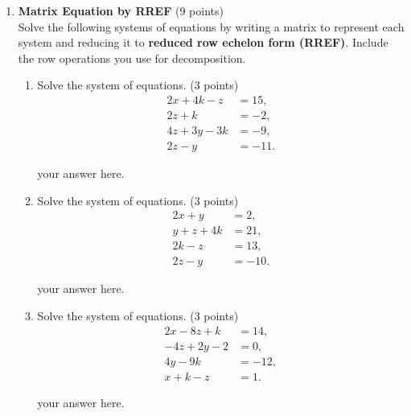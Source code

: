 \begin{enumerate}
  \newpage

  \item \textbf{Matrix Equation by RREF} (9 points)\\
  Solve the following systems of equations by writing a matrix to 
  represent each system and reducing it to \textbf{reduced row echelon form (RREF)}. 
  Include the row operations you use for decomposition.
  \begin{enumerate}
    \item Solve the system of equations. (3 points)
    \[
    \begin{aligned}
    2x + 4k - z &= 15, \\
    2z + k &= -2, \\
    4z + 3y - 3k &= -9, \\
    2z - y &= -11.
    \end{aligned}
    \]
    \begin{subanswer}
      your answer here.
    \end{subanswer}

    \item Solve the system of equations. (3 points)
    \[
    \begin{aligned}
    2x + y &= 2, \\
    y + z + 4k &= 21, \\
    2k - z &= 13, \\
    2z - y &= -10.
    \end{aligned}
    \]
    \begin{subanswer}
      your answer here.
    \end{subanswer}

    \item Solve the system of equations. (3 points)
    \[
    \begin{aligned}
    2x - 8z + k &= 14, \\
    -4z + 2y - 2 &= 0, \\
    4y - 9k &= -12, \\
    x + k - z &= 1.
    \end{aligned}
    \]
    \begin{subanswer}
      your answer here.
    \end{subanswer}
  \end{enumerate}















\end{enumerate}
